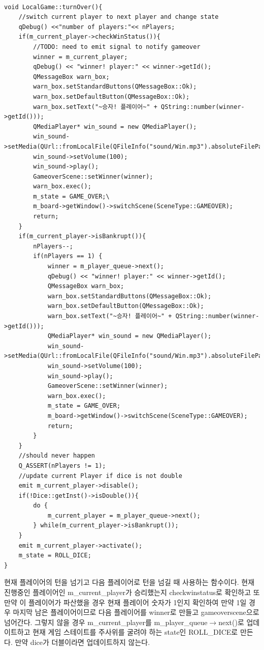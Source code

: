 \documentclass[10pt,oneside,a4paper,titlepage]{article}
\begin{document}
\begin{lstlisting}[frame=single,caption=
{LocalGame turnover},label=code:FD,captionpos=b,framexleftmargin=10pt,escapeinside=~~]

void LocalGame::turnOver(){
    //switch current player to next player and change state
    qDebug() <<"number of players:"<< nPlayers;
    if(m_current_player->checkWinStatus()){
        //TODO: need to emit signal to notify gameover
        winner = m_current_player;
        qDebug() << "winner! player:" << winner->getId();
        QMessageBox warn_box;
        warn_box.setStandardButtons(QMessageBox::Ok);
        warn_box.setDefaultButton(QMessageBox::Ok);
        warn_box.setText("~승자! 플레이어~" + QString::number(winner->getId()));
        QMediaPlayer* win_sound = new QMediaPlayer();
        win_sound->setMedia(QUrl::fromLocalFile(QFileInfo("sound/Win.mp3").absoluteFilePath()));
        win_sound->setVolume(100);
        win_sound->play();
        GameoverScene::setWinner(winner);
        warn_box.exec();
        m_state = GAME_OVER;\
        m_board->getWindow()->switchScene(SceneType::GAMEOVER);
        return;
    }
    if(m_current_player->isBankrupt()){
        nPlayers--;
        if(nPlayers == 1) {
            winner = m_player_queue->next();
            qDebug() << "winner! player:" << winner->getId();
            QMessageBox warn_box;
            warn_box.setStandardButtons(QMessageBox::Ok);
            warn_box.setDefaultButton(QMessageBox::Ok);
            warn_box.setText("~승자! 플레이어~" + QString::number(winner->getId()));
            QMediaPlayer* win_sound = new QMediaPlayer();
            win_sound->setMedia(QUrl::fromLocalFile(QFileInfo("sound/Win.mp3").absoluteFilePath()));
            win_sound->setVolume(100);
            win_sound->play();
            GameoverScene::setWinner(winner);
            warn_box.exec();
            m_state = GAME_OVER;
            m_board->getWindow()->switchScene(SceneType::GAMEOVER);
            return;
        }
    }
    //should never happen
    Q_ASSERT(nPlayers != 1);
    //update current Player if dice is not double
    emit m_current_player->disable();
    if(!Dice::getInst()->isDouble()){
        do {
            m_current_player = m_player_queue->next();
        } while(m_current_player->isBankrupt());
    }
    emit m_current_player->activate();
    m_state = ROLL_DICE;
}
\end{lstlisting}

현재 플레이어의 턴을 넘기고 다음 플레이어로 턴을 넘길 때 사용하는 함수이다. 현재 진행중인 플레이어인 m\_current\_player가 승리했는지 checkwinstatus로 확인하고 또 만약 이 플레이어가 파산했을 경우 현재 플레이어 숫자가 1인지 확인하여 만약 1일 경우 마지막 남은 플레이어이므로 다음 플레이어를 winner로 만들고 gameoverscene으로 넘어간다. 그렇지 않을 경우 m\_current\_player를 m\_player\_queue$\rightarrow$next()로 업데이트하고 현재 게임 스테이트를 주사위를 굴려야 하는 state인 ROLL\_DICE로 만든다. 만약 dice가 더블이라면 업데이트하지 않는다. 
\end{document}
